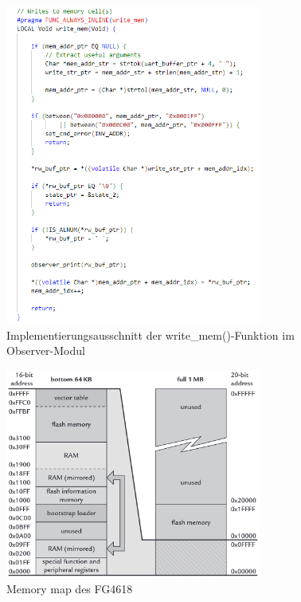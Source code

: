 \begin{figure}[h!]
	\centering
	\includegraphics[width=0.75\textwidth]{../Bilder/ObserverModule/write_mem.png}
	\caption{Implementierungsausschnitt der write\_mem()-Funktion im Observer-Modul}
	\label{fig:write_mem_function}
\end{figure}

\begin{figure}[h!]
	\centering
	\includegraphics[width=0.75\textwidth]{../Bilder/memory_map.png}
	\caption{Memory map des FG4618 }
	\label{fig:memory_map}
\end{figure}

